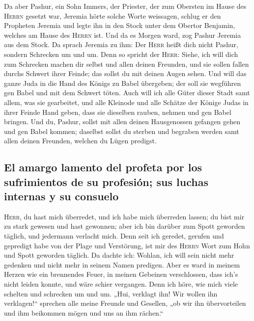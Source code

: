  Da aber Pashur, ein Sohn Immers, der Priester, der zum
Obersten im Hause des \textsc{Herrn} gesetzt war, Jeremia hörte solche
Worte weissagen,  schlug er den Propheten Jeremia und
legte ihn in den Stock unter dem Obertor Benjamin, welches am Hause des
\textsc{Herrn} ist.  Und da es Morgen ward, zog Pashur
Jeremia aus dem Stock. Da sprach Jeremia zu ihm: Der \textsc{Herr} heißt
dich nicht Pashur, sondern Schrecken um und um.  Denn so
spricht der \textsc{Herr}: Siehe, ich will dich zum Schrecken machen dir
selbst und allen deinen Freunden, und sie sollen fallen durchs Schwert
ihrer Feinde; das sollst du mit deinen Augen sehen. Und will das ganze
Juda in die Hand des Königs zu Babel übergeben; der soll sie wegführen
gen Babel und mit dem Schwert töten.  Auch will ich alle
Güter dieser Stadt samt allem, was sie gearbeitet, und alle Kleinode und
alle Schätze der Könige Judas in ihrer Feinde Hand geben, dass sie
dieselben rauben, nehmen und gen Babel bringen.  Und du,
Pashur, sollst mit allen deinen Hausgenossen gefangen gehen und gen
Babel kommen; daselbst sollst du sterben und begraben werden samt allen
deinen Freunden, welchen du Lügen predigst.

\hypertarget{el-amargo-lamento-del-profeta-por-los-sufrimientos-de-su-profesiuxf3n-sus-luchas-internas-y-su-consuelo}{%
\subsection{El amargo lamento del profeta por los sufrimientos de su
profesión; sus luchas internas y su
consuelo}\label{el-amargo-lamento-del-profeta-por-los-sufrimientos-de-su-profesiuxf3n-sus-luchas-internas-y-su-consuelo}}

 \textsc{Herr}, du hast mich überredet, und ich habe mich
überreden lassen; du bist mir zu stark gewesen und hast gewonnen; aber
ich bin darüber zum Spott geworden täglich, und jedermann verlacht mich.
 Denn seit ich geredet, gerufen und gepredigt habe von der
Plage und Verstörung, ist mir des \textsc{Herrn} Wort zum Hohn und Spott
geworden täglich.  Da dachte ich: Wohlan, ich will sein
nicht mehr gedenken und nicht mehr in seinem Namen predigen. Aber es
ward in meinem Herzen wie ein brennendes Feuer, in meinen Gebeinen
verschlossen, dass ich's nicht leiden konnte, und wäre schier vergangen.
 Denn ich höre, wie mich viele schelten und schrecken um
und um. „Hui, verklagt ihn! Wir wollen ihn verklagen!{}`` sprechen alle
meine Freunde und Gesellen, „ob wir ihn übervorteilen und ihm beikommen
mögen und uns an ihm rächen.``

